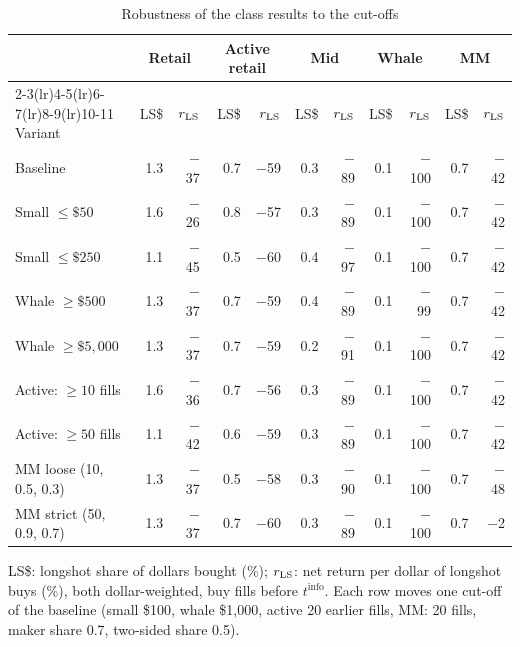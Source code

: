 \begin{table}[t]
\centering
\small
\begin{threeparttable}
\caption{Robustness of the class results to the cut-offs}\label{tab:wallets-robust}
\setlength{\tabcolsep}{4pt}
\begin{tabular}{lrrrrrrrrrr}
\toprule
& \multicolumn{2}{c}{Retail} & \multicolumn{2}{c}{Active retail} & \multicolumn{2}{c}{Mid} & \multicolumn{2}{c}{Whale} & \multicolumn{2}{c}{MM} \\
\cmidrule(lr){2-3}\cmidrule(lr){4-5}\cmidrule(lr){6-7}\cmidrule(lr){8-9}\cmidrule(lr){10-11}
Variant & LS\$ & $r_{\text{LS}}$ & LS\$ & $r_{\text{LS}}$ & LS\$ & $r_{\text{LS}}$ & LS\$ & $r_{\text{LS}}$ & LS\$ & $r_{\text{LS}}$ \\
\midrule
Baseline & 1.3 & $-$37 & 0.7 & $-$59 & 0.3 & $-$89 & 0.1 & $-$100 & 0.7 & $-$42 \\
Small $\leq\$50$ & 1.6 & $-$26 & 0.8 & $-$57 & 0.3 & $-$89 & 0.1 & $-$100 & 0.7 & $-$42 \\
Small $\leq\$250$ & 1.1 & $-$45 & 0.5 & $-$60 & 0.4 & $-$97 & 0.1 & $-$100 & 0.7 & $-$42 \\
Whale $\geq\$500$ & 1.3 & $-$37 & 0.7 & $-$59 & 0.4 & $-$89 & 0.1 & $-$99 & 0.7 & $-$42 \\
Whale $\geq\$5{,}000$ & 1.3 & $-$37 & 0.7 & $-$59 & 0.2 & $-$91 & 0.1 & $-$100 & 0.7 & $-$42 \\
Active: $\geq10$ fills & 1.6 & $-$36 & 0.7 & $-$56 & 0.3 & $-$89 & 0.1 & $-$100 & 0.7 & $-$42 \\
Active: $\geq50$ fills & 1.1 & $-$42 & 0.6 & $-$59 & 0.3 & $-$89 & 0.1 & $-$100 & 0.7 & $-$42 \\
MM loose (10, 0.5, 0.3) & 1.3 & $-$37 & 0.5 & $-$58 & 0.3 & $-$90 & 0.1 & $-$100 & 0.7 & $-$48 \\
MM strict (50, 0.9, 0.7) & 1.3 & $-$37 & 0.7 & $-$60 & 0.3 & $-$89 & 0.1 & $-$100 & 0.7 & $-$2 \\
\bottomrule
\end{tabular}
\begin{tablenotes}\footnotesize
\item LS\$: longshot share of dollars bought (\%); $r_{\text{LS}}$: net return per dollar of longshot buys (\%),
  both dollar-weighted, buy fills before $t^{\mathrm{info}}$. Each row moves one cut-off of the baseline
  (small \$100, whale \$1{,}000, active 20 earlier fills, MM: 20 fills, maker share 0.7, two-sided share 0.5).
\end{tablenotes}
\end{threeparttable}
\end{table}

